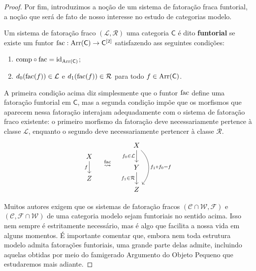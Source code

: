 \begin{proof}
  Por fim, introduzimos a noção de um sistema de fatoração fraca funtorial, a noção que será de fato de nosso interesse no estudo de categorias modelo.
  
  \begin{defin}\label{defin:fatoracao_fraca_funtorial}
    Um sistema de fatoração fraco $(\mathcal{L},\mathcal{R})$ uma categoria $\mathsf{C}$ é dito \textbf{funtorial} se existe um funtor $\mathrm{fac}: \mathrm{Arr}(\mathsf{C}) \to \mathsf{C}^{[2]}$ satisfazendo ass seguintes condições:
    \begin{enumerate}
    \item $\mathrm{comp} \circ \mathrm{fac} = \mathrm{id}_{\mathrm{Arr}(\mathsf{C})}$;
      
    \item $d_{0}(\mathrm{fac}(f)) \in \mathcal{L}$ e $d_{1}(\mathrm{fac}(f)) \in \mathcal{R}$ para todo $f \in \mathrm{Arr}(\mathsf{C})$.
    \end{enumerate}
  \end{defin}
  
  A primeira condição acima diz simplesmente que o funtor $\mathrm{fac}$ define uma fatoração funtorial em $\mathsf{C}$, mas a segunda condição impõe que os morfismos que aparecem nessa fatoração interajam adequadamente com o sistema de fatoração fraco existente: o primeiro morfismo da fatoração deve necessariamente pertence à classe $\mathcal{L}$, enquanto o segundo deve necessariamente pertencer à classe $\mathcal{R}$.
  \begin{displaymath}
    \begin{tikzcd}
      X
      \arrow[d, "f" swap]
      \\ Z
    \end{tikzcd}
    \quad \overset{\fac}{\rightsquigarrow} \quad
    \begin{tikzcd}
      X
      \arrow[d, "f_{0} \in \mathcal{L}" swap]
      \arrow[dd, bend left=45, "f_{1} \circ f_{0} = f"]
      \\ Y
      \arrow[d, "f_{1} \in \mathcal{R}" swap]
      \\ Z
    \end{tikzcd}
  \end{displaymath}
  
  Muitos autores exigem que os sistemas de fatoração fracos $(\mathcal{C} \cap \mathcal{W},\mathcal{F})$ e $(\mathcal{C},\mathcal{F} \cap \mathcal{W})$ de uma categoria modelo sejam funtoriais no sentido acima.
  Isso nem sempre é estritamente necessário, mas é algo que facilita a nossa vida em alguns momentos.
  É importante comentar que, embora nem toda estrutura modelo admita fatorações funtoriais, uma grande parte delas admite, incluindo aquelas obtidas por meio do famigerado Argumento do Objeto Pequeno que estudaremos mais adiante.
\end{proof}